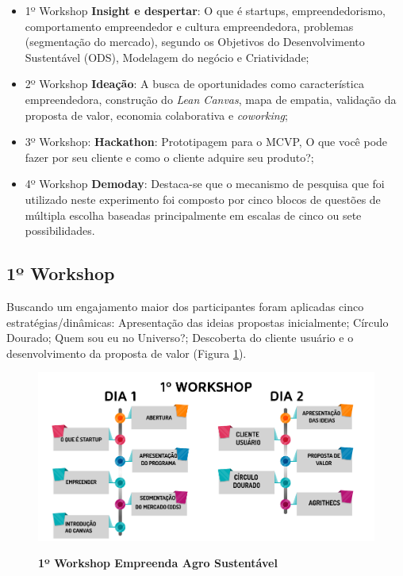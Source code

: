 \begin{itemize}

\item {1º Workshop \textbf{Insight e despertar}: O que é startups, empreendedorismo, comportamento empreendedor e cultura empreendedora, problemas (segmentação do mercado), segundo os Objetivos do Desenvolvimento Sustentável (ODS), Modelagem do negócio e Criatividade;}
\item {2º Workshop \textbf{Ideação}: A busca de oportunidades como característica empreendedora, construção do \textit{\textit{Lean Canvas}}, mapa de empatia, validação da proposta de valor, economia colaborativa e \textit{coworking};}

\item {3º Workshop: \textbf{Hackathon}: Prototipagem para o MCVP, O que você pode fazer por seu cliente e como o cliente adquire seu produto?;}

\item {4º Workshop \textbf{Demoday}: Destaca-se que o mecanismo de pesquisa que foi utilizado neste experimento foi composto por cinco blocos de questões de múltipla escolha baseadas principalmente em escalas de cinco ou sete possibilidades.}
\end{itemize}

\subsection{1º Workshop}

Buscando um engajamento maior dos participantes foram aplicadas cinco estratégias/dinâmicas: Apresentação das ideias propostas inicialmente; Círculo Dourado; Quem sou eu no Universo?; Descoberta do cliente usuário e o  desenvolvimento da proposta de valor (Figura \ref{figura_30}).

\begin{figure}[!h]
\centering
\caption{\textbf{1º Workshop Empreenda Agro Sustentável}}
\includegraphics[scale=0.4]{Imagens/workshop-01.png}
\label{figura_30}
\end{figure}

